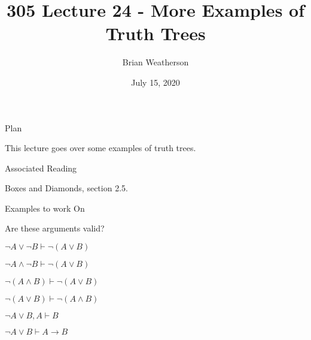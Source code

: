 \documentclass[
  ignorenonframetext,
]{beamer}
\title{305 Lecture 24 - More Examples of Truth Trees}
\author{Brian Weatherson}
\date{July 15, 2020}
\renewcommand{\,}{\text{, }}
\begin{document}
\frame{\titlepage}

\begin{frame}{Plan}
\protect\hypertarget{plan}{}

This lecture goes over some examples of truth trees.

\end{frame}

\begin{frame}{Associated Reading}
\protect\hypertarget{associated-reading}{}

Boxes and Diamonds, section 2.5.

\end{frame}

\begin{frame}{Examples to work On}
\protect\hypertarget{examples-to-work-on}{}

Are these arguments valid?

\end{frame}

\begin{frame}{\(\neg A \vee \neg B \vdash \neg (A \vee B)\)}
\protect\hypertarget{neg-a-vee-neg-b-vdash-neg-a-vee-b}{}

\end{frame}

\begin{frame}{\(\neg A \wedge \neg B \vdash \neg (A \vee B)\)}
\protect\hypertarget{neg-a-wedge-neg-b-vdash-neg-a-vee-b}{}

\end{frame}

\begin{frame}{\(\neg (A \wedge B) \vdash \neg (A \vee B)\)}
\protect\hypertarget{neg-a-wedge-b-vdash-neg-a-vee-b}{}

\end{frame}

\begin{frame}{\(\neg (A \vee B) \vdash \neg (A \wedge B)\)}
\protect\hypertarget{neg-a-vee-b-vdash-neg-a-wedge-b}{}

\end{frame}

\begin{frame}{\(\neg A \vee B, A \vdash B\)}
\protect\hypertarget{neg-a-vee-b-a-vdash-b}{}

\end{frame}

\begin{frame}{\(\neg A \vee B \vdash A \rightarrow B\)}
\protect\hypertarget{neg-a-vee-b-vdash-a-rightarrow-b}{}

\end{frame}
\end{document}
